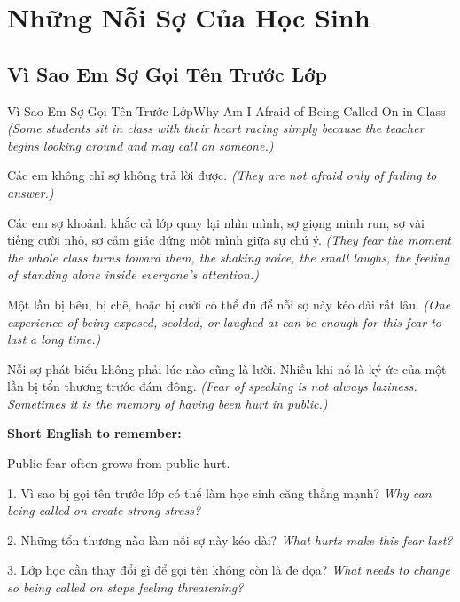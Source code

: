 \chapter{Những Nỗi Sợ Của Học Sinh}

\section{Vì Sao Em Sợ Gọi Tên Trước Lớp}
\begin{truyen}{Vì Sao Em Sợ Gọi Tên Trước Lớp}{Why Am I Afraid of Being Called On in Class}
\textit{(Some students sit in class with their heart racing simply because the teacher begins looking around and may call on someone.)}

Các em không chỉ sợ không trả lời được.
\textit{(They are not afraid only of failing to answer.)}

Các em sợ khoảnh khắc cả lớp quay lại nhìn mình, sợ giọng mình run, sợ vài tiếng cười nhỏ, sợ cảm giác đứng một mình giữa sự chú ý.
\textit{(They fear the moment the whole class turns toward them, the shaking voice, the small laughs, the feeling of standing alone inside everyone's attention.)}

Một lần bị bêu, bị chê, hoặc bị cười có thể đủ để nỗi sợ này kéo dài rất lâu.
\textit{(One experience of being exposed, scolded, or laughed at can be enough for this fear to last a long time.)}
\end{truyen}

\begin{baihoc}
Nỗi sợ phát biểu không phải lúc nào cũng là lười. Nhiều khi nó là ký ức của một lần bị tổn thương trước đám đông.
\textit{(Fear of speaking is not always laziness. Sometimes it is the memory of having been hurt in public.)}
\end{baihoc}

\begin{ghinhoanh}
\textbf{Short English to remember:}

Public fear often grows from public hurt.

\end{ghinhoanh}

\begin{tuhocnhanh}
1. Vì sao bị gọi tên trước lớp có thể làm học sinh căng thẳng mạnh? \textit{Why can being called on create strong stress?}

2. Những tổn thương nào làm nỗi sợ này kéo dài? \textit{What hurts make this fear last?}

3. Lớp học cần thay đổi gì để gọi tên không còn là đe dọa? \textit{What needs to change so being called on stops feeling threatening?}
\end{tuhocnhanh}
\ngancach

